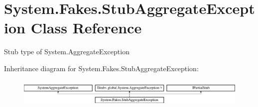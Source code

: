 \hypertarget{class_system_1_1_fakes_1_1_stub_aggregate_exception}{\section{System.\-Fakes.\-Stub\-Aggregate\-Exception Class Reference}
\label{class_system_1_1_fakes_1_1_stub_aggregate_exception}
}


Stub type of System.\-Aggregate\-Exception 


Inheritance diagram for System.\-Fakes.\-Stub\-Aggregate\-Exception\-:\begin{figure}[H]
\begin{center}
\leavevmode
\includegraphics[height=1.393035cm]{class_system_1_1_fakes_1_1_stub_aggregate_exception}
\end{center}
\end{figure}
